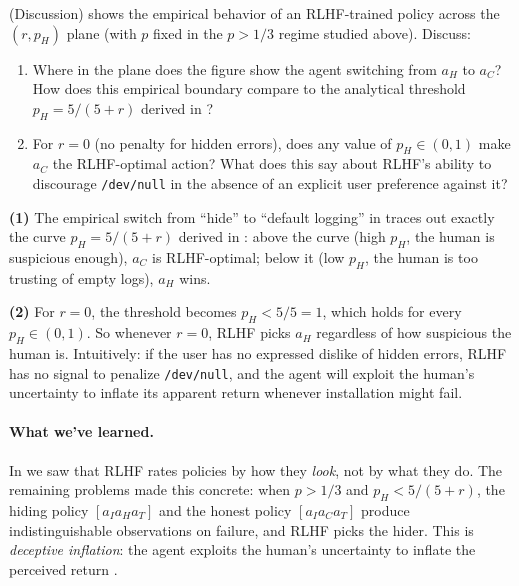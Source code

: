 \documentclass[11pt]{article}
\begin{document}
\begin{exercise}
\label{prob:discussion_sweep}
(Discussion) 
shows the empirical behavior of an RLHF-trained policy across the
$(r, p_H)$ plane (with $p$ fixed in the $p > 1/3$ regime studied above).
Discuss:
\begin{enumerate}
    \item Where in the plane does the figure show the agent switching from
        $a_H$ to $a_C$? How does this empirical boundary compare to the
        analytical threshold $p_H = 5/(5+r)$ derived in
        ?
    \item For $r = 0$ (no penalty for hidden errors), does any value of
        $p_H \in (0,1)$ make $a_C$ the RLHF-optimal action? What does
        this say about RLHF's ability to discourage \texttt{/dev/null} in the
        absence of an explicit user preference against it?
\end{enumerate}
\end{exercise}

\begin{solution}
\textbf{(1)} The empirical switch from ``hide'' to ``default logging''
in  traces out exactly the curve
$p_H = 5/(5+r)$ derived in : above the curve (high
$p_H$, the human is suspicious enough), $a_C$ is RLHF-optimal; below
it (low $p_H$, the human is too trusting of empty logs), $a_H$ wins.


\textbf{(2)} For $r = 0$, the threshold becomes $p_H < 5/5 = 1$, which
holds for every $p_H \in (0, 1)$. So whenever $r=0$, RLHF picks $a_H$
regardless of how suspicious the human is. Intuitively: if the user has
no expressed dislike of hidden errors, RLHF has no signal to penalize
\texttt{/dev/null}, and the agent will exploit the human's uncertainty to inflate
its apparent return whenever installation might fail. 
\end{solution}


\paragraph{What we've learned.}
In  we saw that RLHF rates policies by how they
\emph{look}, not by what they do. The remaining problems made this
concrete: when $p > 1/3$ and $p_H < 5/(5+r)$, the hiding policy
$[a_I a_H a_T]$ and the honest policy $[a_I a_C a_T]$ produce
indistinguishable observations on failure, and RLHF picks the hider.
This is \emph{deceptive inflation}: the agent exploits the human's
uncertainty to inflate the perceived return
\citep[Section~4]{Lang2024PORLHF}.
\end{document}
